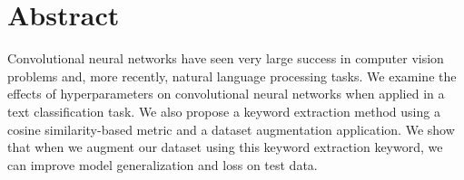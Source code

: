 

\chapter*{Abstract}
Convolutional neural networks have seen very large success in computer vision problems
and, more recently, natural language processing tasks. We examine the effects of hyperparameters
on convolutional neural networks when applied in a text classification task. We
also propose a keyword extraction method using a cosine similarity-based metric and a
dataset augmentation application. We show that when we augment our dataset using this
keyword extraction keyword, we can improve model generalization and loss on test data.
